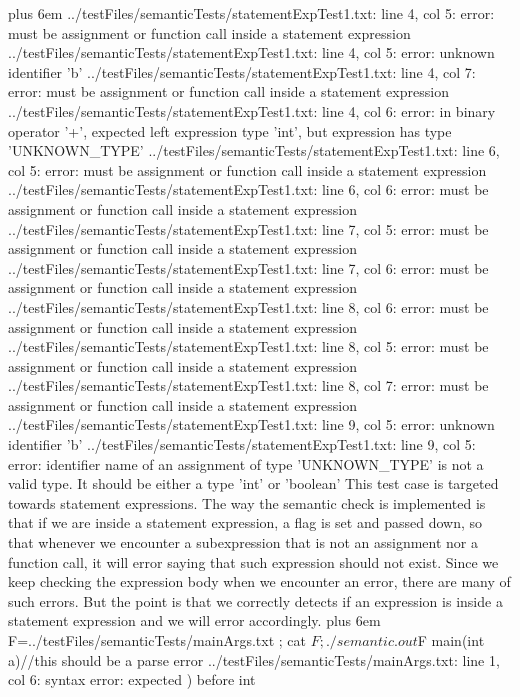 \documentclass{article}
\makeatletter
\newenvironment{myverb}
 {\def\@xobeysp{\ }\verbatim\rightskip=0pt plus 6em\relax}
 {\endverbatim}
\makeatother
\begin{document}
\begin{itemize}
\begin{myverb}
../testFiles/semanticTests/statementExpTest1.txt: line 4, col 5: error: must be assignment or function call inside a statement expression
../testFiles/semanticTests/statementExpTest1.txt: line 4, col 5: error: unknown identifier 'b'
../testFiles/semanticTests/statementExpTest1.txt: line 4, col 7: error: must be assignment or function call inside a statement expression
../testFiles/semanticTests/statementExpTest1.txt: line 4, col 6: error: in binary operator '+', expected left expression type 'int', but expression has type 'UNKNOWN_TYPE'
../testFiles/semanticTests/statementExpTest1.txt: line 6, col 5: error: must be assignment or function call inside a statement expression
../testFiles/semanticTests/statementExpTest1.txt: line 6, col 6: error: must be assignment or function call inside a statement expression
../testFiles/semanticTests/statementExpTest1.txt: line 7, col 5: error: must be assignment or function call inside a statement expression
../testFiles/semanticTests/statementExpTest1.txt: line 7, col 6: error: must be assignment or function call inside a statement expression
../testFiles/semanticTests/statementExpTest1.txt: line 8, col 6: error: must be assignment or function call inside a statement expression
../testFiles/semanticTests/statementExpTest1.txt: line 8, col 5: error: must be assignment or function call inside a statement expression
../testFiles/semanticTests/statementExpTest1.txt: line 8, col 7: error: must be assignment or function call inside a statement expression
../testFiles/semanticTests/statementExpTest1.txt: line 9, col 5: error: unknown identifier 'b'
../testFiles/semanticTests/statementExpTest1.txt: line 9, col 5: error: identifier name of an assignment of type 'UNKNOWN_TYPE' is not a valid type. It should be either a type 'int' or 'boolean'
\end{myverb}
This test case is targeted towards statement expressions. The way the semantic check is implemented is that if we are inside a statement expression, a flag is set and passed down, so that whenever we encounter a subexpression that is not an assignment nor a function call, it will error saying that such expression should not exist. Since we keep checking the expression body when we encounter an error, there are many of such errors. But the point is that we correctly detects if an expression is inside a statement expression and we will error accordingly.
\begin{myverb}
F=../testFiles/semanticTests/mainArgs.txt ; cat $F; ./semantic.out $F
main(int a){}//this should be a parse error
../testFiles/semanticTests/mainArgs.txt: line 1, col 6: syntax error:  expected ) before int

\end{myverb}
\end{itemize}
\end{document}
